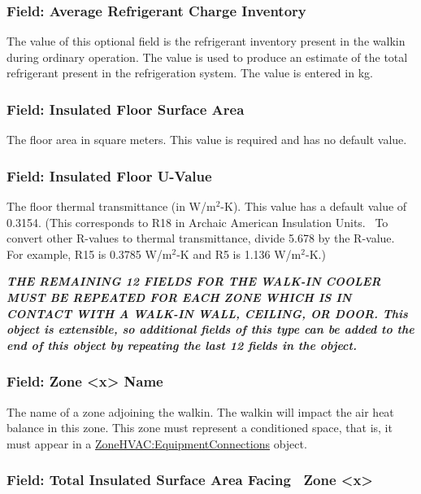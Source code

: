 \subsubsection{Field: Average Refrigerant Charge Inventory}\label{field-average-refrigerant-charge-inventory-1}

The value of this optional field is the refrigerant inventory present in the walkin during ordinary operation. The value is used to produce an estimate of the total refrigerant present in the refrigeration system. The value is entered in kg.

\subsubsection{Field: Insulated Floor Surface Area}\label{field-insulated-floor-surface-area}

The floor area in square meters. This value is required and has no default value.

\subsubsection{Field: Insulated Floor U-Value}\label{field-insulated-floor-u-value}

The floor thermal transmittance (in W/m\(^{2}\)-K). This value has a default value of 0.3154. (This corresponds to R18 in Archaic American Insulation Units.~ To convert other R-values to thermal transmittance, divide 5.678 by the R-value.~ For example, R15 is 0.3785 W/m\(^{2}\)-K and R5 is 1.136 W/m\(^{2}\)-K.)

\textbf{\emph{THE REMAINING 12 FIELDS FOR THE WALK-IN COOLER MUST BE REPEATED FOR EACH ZONE WHICH IS IN CONTACT WITH A WALK-IN WALL, CEILING, OR DOOR.  This object is extensible, so additional fields of this type can be added to the end of this object by repeating the last 12 fields in the object.}}

\subsubsection{Field: Zone \textless{}x\textgreater{} Name}\label{field-zone-x-name}

The name of a zone adjoining the walkin. The walkin will impact the air heat balance in this zone. This zone must represent a conditioned space, that is, it must appear in a \hyperref[zonehvacequipmentconnections]{ZoneHVAC:EquipmentConnections} object.

\subsubsection{Field: Total Insulated Surface Area Facing~ Zone \textless{}x\textgreater{}}\label{field-total-insulated-surface-area-facing-zone-x}

